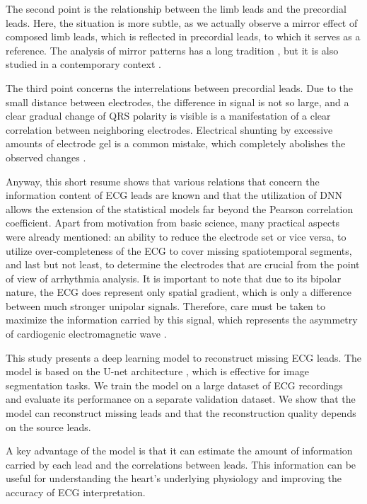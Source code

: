 \documentclass[preprint,12pt]{elsarticle}
\begin{document}
The second point is the relationship between the limb leads and the precordial leads. Here, the situation is more subtle, as we actually observe a mirror effect of composed limb leads, which is reflected in precordial leads, to which it serves as a reference. The analysis of mirror patterns has a long tradition \cite{Schmitt, Brody}, but it is also studied in a contemporary context \cite{Vaidya, Wang}. 

The third point concerns the interrelations between precordial leads. Due to the small distance between electrodes, the difference in signal is not so large, and a clear gradual change of QRS polarity is visible \cite{Meek} is a manifestation of a clear correlation between neighboring electrodes. Electrical shunting by excessive amounts of electrode gel is a common mistake, which completely abolishes the observed changes \cite{Riera}.

Anyway, this short resume shows that various relations that concern the information content of ECG leads are known and that the utilization of DNN allows the extension of the statistical models far beyond the Pearson correlation coefficient. Apart from motivation from basic science, many practical aspects were already mentioned: an ability to reduce the electrode set or vice versa, to utilize over-completeness of the ECG to cover missing spatiotemporal segments, and last but not least, to determine the electrodes that are crucial from the point of view of arrhythmia analysis. It is important to note that due to its bipolar nature, the ECG does represent only spatial gradient, which is only a difference between much stronger unipolar signals. Therefore, care must be taken to maximize the information carried by this signal, which represents the asymmetry of cardiogenic electromagnetic wave \cite{Buchner}. 

This study presents a deep learning model to reconstruct missing ECG leads. The model is based on the U-net architecture \cite{unet}, which is effective for image segmentation tasks. We train the model on a large dataset of ECG recordings and evaluate its performance on a separate validation dataset. We show that the model can reconstruct missing leads and that the reconstruction quality depends on the source leads.

A key advantage of the model is that it can estimate the amount of information carried by each lead and the correlations between leads. This information can be useful for understanding the heart's underlying physiology and improving the accuracy of ECG interpretation.
\end{document}

